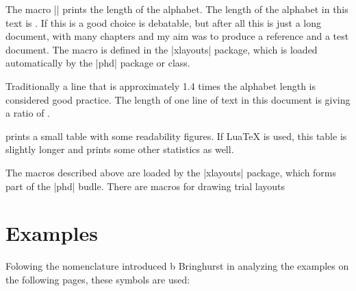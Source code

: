 \begin{macro}{\alphabetlength}
The macro |\alphabetlength| prints the length of the alphabet. The length of the alphabet in this text is \alphabetlength. If this is a good choice is debatable, but after all this is just a long document, with many chapters and my aim was to produce a reference and a test document. The macro is defined in the |xlayouts|  package, which is loaded automatically by the |phd| package or class. 
\end{macro}

Traditionally  a line that is approximately 1.4 times the alphabet length is considered good practice. The length of one line of text in this document is \the\textwidth giving a ratio of \alphabetsperline.

\DescribeMacro{\printreadability} prints a small table with some readability figures. If LuaTeX is used, this table is slightly longer and prints some other statistics as well. 

\begin{figure}[htbp]
\drawtriallayout
\bigskip

\printreadability
{}
\end{figure}

The macros described above are loaded by the |xlayouts| package, which forms part of the |phd| budle. There are macros for drawing trial layouts 


\section{Examples}
Folowing the nomenclature introduced b Bringhurst in analyzing the examples on the following pages, 
these symbols are used:


